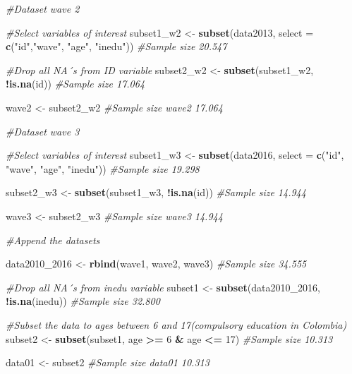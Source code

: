 \documentclass[
]{article}
\newenvironment{Shaded}{\begin{snugshade}}{\end{snugshade}}
\newcommand{\CommentTok}[1]{\textcolor[rgb]{0.56,0.35,0.01}{\textit{#1}}}
\newcommand{\DataTypeTok}[1]{\textcolor[rgb]{0.13,0.29,0.53}{#1}}
\newcommand{\DecValTok}[1]{\textcolor[rgb]{0.00,0.00,0.81}{#1}}
\newcommand{\KeywordTok}[1]{\textcolor[rgb]{0.13,0.29,0.53}{\textbf{#1}}}
\newcommand{\NormalTok}[1]{#1}
\newcommand{\OperatorTok}[1]{\textcolor[rgb]{0.81,0.36,0.00}{\textbf{#1}}}
\newcommand{\StringTok}[1]{\textcolor[rgb]{0.31,0.60,0.02}{#1}}
\begin{document}
\begin{Shaded}
\begin{Highlighting}[]
\CommentTok{#Dataset wave 2}

\CommentTok{#Select variables of interest}
\NormalTok{subset1_w2 <-}\StringTok{ }\KeywordTok{subset}\NormalTok{(data2013, }\DataTypeTok{select =} \KeywordTok{c}\NormalTok{(}\StringTok{"id"}\NormalTok{,}\StringTok{"wave"}\NormalTok{, }\StringTok{"age"}\NormalTok{, }\StringTok{"inedu"}\NormalTok{))}
\CommentTok{#Sample size 20.547}

\CommentTok{#Drop all NA´s from ID variable}
\NormalTok{subset2_w2 <-}\StringTok{ }\KeywordTok{subset}\NormalTok{(subset1_w2, }\OperatorTok{!}\KeywordTok{is.na}\NormalTok{(id))}
\CommentTok{#Sample size 17.064}

\NormalTok{wave2 <-}\StringTok{ }\NormalTok{subset2_w2 }\CommentTok{#Sample size wave2 17.064}
\end{Highlighting}
\end{Shaded}

\begin{Shaded}
\begin{Highlighting}[]
\CommentTok{#Dataset wave 3}

\CommentTok{#Select variables of interest}
\NormalTok{subset1_w3 <-}\StringTok{ }\KeywordTok{subset}\NormalTok{(data2016, }\DataTypeTok{select =} \KeywordTok{c}\NormalTok{(}\StringTok{"id"}\NormalTok{, }\StringTok{"wave"}\NormalTok{, }\StringTok{"age"}\NormalTok{, }\StringTok{"inedu"}\NormalTok{))}
\CommentTok{#Sample size 19.298}

\NormalTok{subset2_w3 <-}\StringTok{ }\KeywordTok{subset}\NormalTok{(subset1_w3, }\OperatorTok{!}\KeywordTok{is.na}\NormalTok{(id))}
\CommentTok{#Sample size 14.944}

\NormalTok{wave3 <-}\StringTok{ }\NormalTok{subset2_w3 }\CommentTok{#Sample size wave3 14.944}
\end{Highlighting}
\end{Shaded}

\begin{Shaded}
\begin{Highlighting}[]
\CommentTok{#Append the datasets}

\NormalTok{data2010_}\DecValTok{2016}\NormalTok{ <-}\StringTok{ }\KeywordTok{rbind}\NormalTok{(wave1, wave2, wave3) }\CommentTok{#Sample size 34.555}

\CommentTok{#Drop all NA´s from inedu variable}
\NormalTok{subset1 <-}\StringTok{ }\KeywordTok{subset}\NormalTok{(data2010_}\DecValTok{2016}\NormalTok{, }\OperatorTok{!}\KeywordTok{is.na}\NormalTok{(inedu))}
\CommentTok{#Sample size 32.800}

\CommentTok{#Subset the data to ages between 6 and 17(compulsory education in Colombia)}
\NormalTok{subset2 <-}\StringTok{ }\KeywordTok{subset}\NormalTok{(subset1, age }\OperatorTok{>=}\StringTok{ }\DecValTok{6} \OperatorTok{&}\StringTok{ }\NormalTok{age }\OperatorTok{<=}\StringTok{ }\DecValTok{17}\NormalTok{)}
\CommentTok{#Sample size 10.313}

\NormalTok{data01 <-}\StringTok{ }\NormalTok{subset2}
\CommentTok{#Sample size data01 10.313}
\end{Highlighting}
\end{Shaded}
\end{document}
